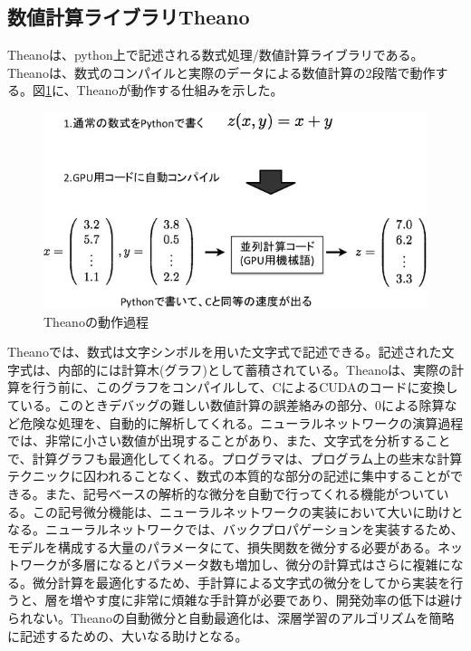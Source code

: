 \subsection{数値計算ライブラリTheano}
Theanoは、python上で記述される数式処理/数値計算ライブラリである。Theanoは、数式のコンパイルと実際のデータによる数値計算の2段階で動作する\cite{bergstra2010theano:}。図\ref{c4_Theano_compile}に、Theanoが動作する仕組みを示した。
\begin{figure}[tbp]
 \centering
  \includegraphics[width=120mm]{img/c4/theano_compile}
 \caption{Theanoの動作過程}
 \label{c4_Theano_compile}
\end{figure}
Theanoでは、数式は文字シンボルを用いた文字式で記述できる。記述された文字式は、内部的には計算木(グラフ)として蓄積されている。Theanoは、実際の計算を行う前に、このグラフをコンパイルして、CによるCUDAのコードに変換している。このときデバッグの難しい数値計算の誤差絡みの部分、0による除算など危険な処理を、自動的に解析してくれる。ニューラルネットワークの演算過程では、非常に小さい数値が出現することがあり、また、文字式を分析することで、計算グラフも最適化してくれる。プログラマは、プログラム上の些末な計算テクニックに囚われることなく、数式の本質的な部分の記述に集中することができる。また、記号ベースの解析的な微分を自動で行ってくれる機能がついている。この記号微分機能は、ニューラルネットワークの実装において大いに助けとなる。ニューラルネットワークでは、バックプロパゲーションを実装するため、モデルを構成する大量のパラメータにて、損失関数を微分する必要がある。ネットワークが多層になるとパラメータ数も増加し、微分の計算式はさらに複雑になる。微分計算を最適化するため、手計算による文字式の微分をしてから実装を行うと、層を増やす度に非常に煩雑な手計算が必要であり、開発効率の低下は避けられない。Theanoの自動微分と自動最適化は、深層学習のアルゴリズムを簡略に記述するための、大いなる助けとなる。

